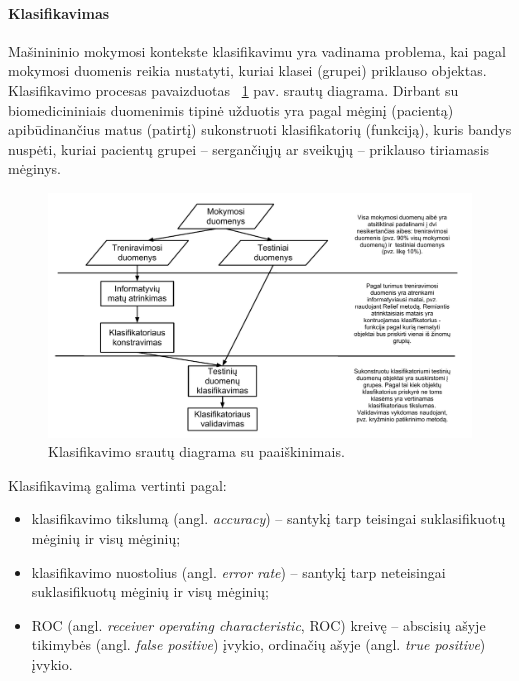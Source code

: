 
\paragraph{Klasifikavimas}

Mašinininio mokymosi kontekste klasifikavimu yra vadinama problema, kai pagal mokymosi duomenis reikia nustatyti, kuriai klasei (grupei) priklauso objektas. Klasifikavimo procesas pavaizduotas ~\ref{fig:classification_process} pav. srautų diagrama. Dirbant su biomedicininiais duomenimis tipinė užduotis yra pagal mėginį (pacientą) apibūdinančius matus (patirtį) sukonstruoti klasifikatorių (funkciją), kuris bandys nuspėti, kuriai pacientų grupei -- sergančiųjų ar sveikųjų -- priklauso tiriamasis mėginys.
\begin{figure}
 \centering
 \includegraphics[width=\textwidth]{images/classification_process.pdf}
 \caption{Klasifikavimo srautų diagrama su paaiškinimais.}
 \label{fig:classification_process}
\end{figure}
Klasifikavimą galima vertinti pagal:
\begin{itemize}
 \item klasifikavimo tikslumą (angl. \textit{accuracy}) -- santykį tarp teisingai suklasifikuotų mėginių ir visų mėginių;
 \item klasifikavimo nuostolius (angl. \textit{error rate}) -- santykį tarp neteisingai suklasifikuotų mėginių ir visų mėginių;
 \item ROC (angl. \textit{receiver operating characteristic}, ROC) kreivę -- abscisių ašyje tikimybės (angl. \textit{false positive}) įvykio, ordinačių ašyje (angl. \textit{true positive}) įvykio.
\end{itemize}

